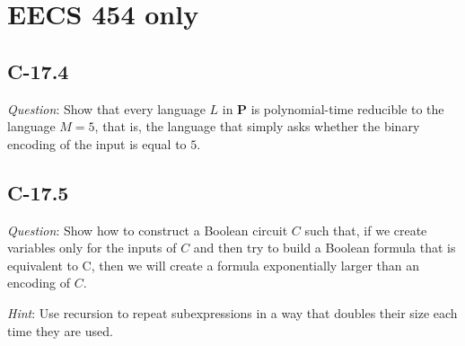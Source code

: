 \documentclass[11pt]{article}
\begin{document}
\section{EECS 454 only}
\subsection{C-17.4}
\noindent \emph{Question}: Show that every language $L$ in \textbf{P} is polynomial-time reducible to the language $M = {5}$, that is, the language that simply asks whether the binary encoding of
the input is equal to $5$.
\subsection{C-17.5}
\noindent \emph{Question}: Show how to construct a Boolean circuit $C$ such that, if we create variables only for the inputs of $C$ and then try to build a Boolean formula that is equivalent to
C, then we will create a formula exponentially larger than an encoding of $C$.

\noindent \emph{Hint}: Use recursion to repeat subexpressions in a way that doubles their size each time they are used.
\end{document}
